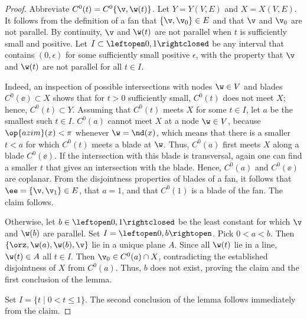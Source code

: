 \begin{proof}
Abbreviate $C^0(t) = C^0\{\v,\w(t)\}$.
Let $Y = Y(V,E)$ and $X = X(V,E)$.
It follows from the definition of a fan that $\{\v,\v_0\}\in E$ and
that $\v$ and $\v_0$ are not parallel.  By continuity, $\v$ and $\w(t)$
are not parallel when $t$ is sufficiently small and positive.  
Let $I\subset\leftopen0,1\rightclosed$ be any interval that contains
$(0,\epsilon)$ for some sufficiently small positive $\epsilon$, with the
property that $\v$ and $\w(t)$ are not parallel for all $t\in I$.

  Indeed, an inspection of possible
intersections with nodes $\w\in V$ and blades $C^0(\ee)\subset X$
shows that for $t>0$ sufficiently small, $C^0(t)$ does not meet $X$;
hence, $C^0(t)\subset Y$.  Assuming that $C^0(t)$ meets $X$ for some
$t\in I$, let $a$ be the smallest such $t\in I$.  $C^0(a)$ cannot meet
$X$ at a node $\w\in V$, because $\op{azim}(x)<\pi$ whenever
$\w=\nd(x)$, which means that
there is a smaller $t<a$ for which $C^0(t)$ meets a blade at $\w$.
Thus, $C^0(a)$ first meets $X$ along a blade $C^0(\ee)$. If the
intersection with this blade is transversal, again one can find a
smaller $t$ that gives an intersection with the blade.  Hence,
$C^0(a)$ and $C^0(\ee)$ are coplanar.  From the disjointness
properties of blades of a fan, it follows that $\ee = \{\v,\v_1\}\in
E$, that $a=1$, and that $C^0(1)$ is a blade of the fan.  The claim
follows.

  Otherwise, let $b\in
\leftopen0,1\rightclosed$ be the least constant for which $\v$ and
$\w(b)$ are parallel.  Set  $I=\leftopen0,b\rightopen$.  
Pick $0<a<b$.  Then $\{\orz,\w(a),\w(b),\v\}$ lie in a unique plane
$A$.  Since all $\w(t)$ lie in a line, $\w(t)\in A$ all $t\in I$.
Then $\v_0\in C^0(a)\cap X$, contradicting the established
disjointness of $X$ from $C^0(a)$.  Thus, $b$ does not exist, proving
 the claim and the first conclusion of the lemma.

Set $I= \{t\mid 0 < t \le 1\}$.  The second conclusion of the lemma
follows immediately from the claim.
\end{proof}


